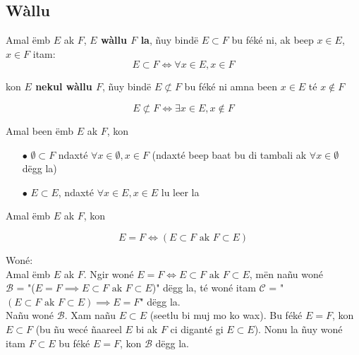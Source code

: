 \documentclass[twoside, a4paper]{article}
\begin{document}
\subsection{Wàllu}
\begin{tcolorbox}[enhanced jigsaw,breakable,pad at break*=1mm, colback=red!5!white,colframe=white!75!black,title= Téeki,watermark color=white]
  Amal ëmb $E$ ak $F$, \textbf{$E$ wàllu $F$ la}, ñuy bindë $E\subset F$ bu féké ni, ak beep $x\in E$, $x\in F$ itam:
  $$E \subset F \iff \forall x \in E, x \in F$$

  kon \textbf{$E$ nekul wàllu $F$}, ñuy bindë $E \not \subset F$ bu féké ni amna been $x \in E$ té $x \not \in F$

  $$E \not \subset F \iff \exists x \in E, x \not \in F$$
\end{tcolorbox}
\begin{tcolorbox}[enhanced jigsaw,breakable,pad at break*=1mm, colback=orange!5!white,colframe=white!75!black,title= Seetlu,
    watermark color=white]
  Amal been ëmb $E$ ak $F$, kon
  \begin{itemize}
    \item[$\bullet$] $\emptyset \subset F$ ndaxté $\forall x \in \emptyset, x\in F$ (ndaxté beep baat bu di tambali ak $\forall x \in \emptyset$ dëgg la)
    \item[$\bullet$] $E \subset E$, ndaxté $\forall x \in E, x \in E$ lu leer la
  \end{itemize}
\end{tcolorbox}

\begin{tcolorbox}[enhanced jigsaw,breakable,pad at break*=1mm, colback=blue!5!white,colframe=white!75!black,title= Tèg\footnote{Proposition},
    watermark color=white]
  Amal ëmb $E$ ak $F$, kon

  $$E = F \iff (E \subset F \text{ ak } F \subset E) $$
\end{tcolorbox}
Woné:\\

Amal ëmb $E$ ak $F$. Ngir woné $E = F \iff E \subset F \text{ ak } F \subset E $, mën nañu woné  \\
$\mathcal{B}$ = "($E = F \implies E \subset F \text{ ak } F \subset E $)" dëgg la, té woné itam $\mathcal{C}$ = "$(E \subset F \text{ ak } F \subset E) \implies E=F $" dëgg la.\\

Nañu woné $\mathcal{B}$. Xam nañu $E\subset E$ (seetlu bi muj mo ko wax). Bu féké $E=F$, kon $E \subset F$ (bu ñu wecé ñaareel $E$ bi ak $F$ ci diganté gi $E\subset E$). Nonu la ñuy woné itam $F\subset E$ bu féké $E=F$, kon $\mathcal{B}$ dëgg la. \\
\end{document}
